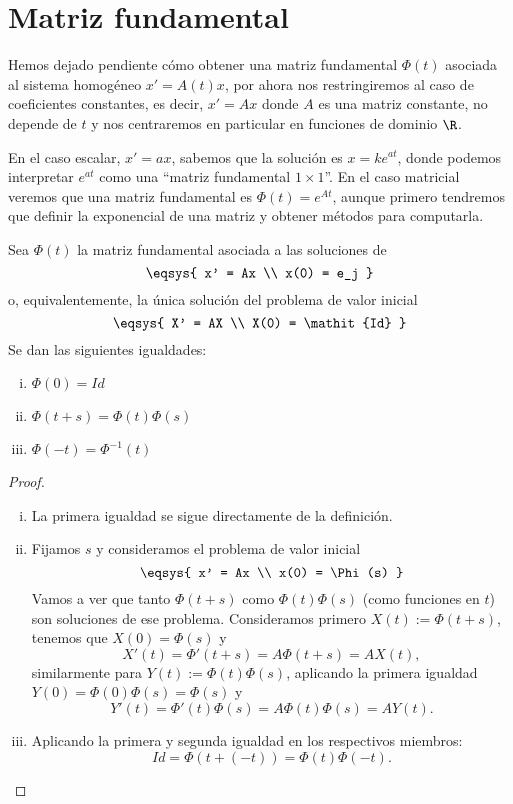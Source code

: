 \documentclass[../ecuaciones_diferenciales.tex]{subfiles}
\begin{document}
\section{Matriz fundamental}

Hemos dejado pendiente cómo obtener una matriz fundamental \(\Phi(t)\) asociada
al sistema homogéneo \(x' = A(t)x\), por ahora nos restringiremos al caso de
coeficientes constantes, es decir, \(x' = Ax\) donde \(A\) es una matriz
constante, no depende de \(t\) y nos centraremos en particular en funciones de 
dominio \(\R\).  

En el caso escalar, \(x' = ax\), sabemos que la solución es \(x = ke^{at}\),
donde podemos interpretar \(e^{at}\) como una ``matriz fundamental
\(1 \times 1\)''. En el caso matricial veremos que una matriz fundamental es
\(\Phi(t) = e^{At}\), aunque primero tendremos que definir la exponencial de una
matriz y obtener métodos para computarla.

\begin{lemma}
\label{lem:expphi}
	Sea \(\Phi(t)\) la matriz fundamental asociada a las soluciones de
	\[\eqsys{
		x' = Ax \\
		x(0) = e_j
		}\]
      o, equivalentemente, la única solución del problema de valor inicial
	\[\eqsys{
		X' = AX \\
		X(0) = \mathit{Id}
		}\]
	Se dan las siguientes igualdades:
	\begin{multicols}{3}
	\begin{enumerate}[i)]
		\item \(\displaystyle \Phi(0) = \mathit{Id}\) 
		\item \(\displaystyle \Phi(t + s) = \Phi(t) \Phi(s)\) 
		\item \(\displaystyle \Phi(-t) = \Phi^{-1}(t)\) 
	\end{enumerate}
	\end{multicols}
\end{lemma}

\begin{proof}
	\begin{enumerate}[i), wide, labelwidth=0pt, labelindent=0pt]
		\item La primera igualdad se sigue directamente de la definición.
		\item Fijamos \(s\) y consideramos el problema de valor inicial
			\[\eqsys{ x' = Ax \\ x(0) = \Phi(s) }\]
			Vamos a ver que tanto \(\Phi(t + s)\) como \(\Phi(t)\Phi(s)\) (como
			funciones en \(t\)) son soluciones de ese problema. Consideramos
			primero \(X(t) := \Phi(t + s)\), tenemos que \(X(0) = \Phi(s)\) y
			\[X'(t) = \Phi'(t + s) = A \Phi(t + s) = A X(t),\]
			similarmente para \(Y(t) := \Phi(t)\Phi(s)\), aplicando la primera 
			igualdad \(Y(0) = \Phi(0)\Phi(s) = \Phi(s)\) y
			\[Y'(t) = \Phi'(t)\Phi(s) = A \Phi(t)\Phi(s) = A Y(t).\]
		\item Aplicando la primera y segunda igualdad en los respectivos
			miembros:
			\[\mathit{Id} = \Phi(t + (-t)) = \Phi(t)\Phi(-t).\]
	\end{enumerate}
\end{proof}
\end{document}
